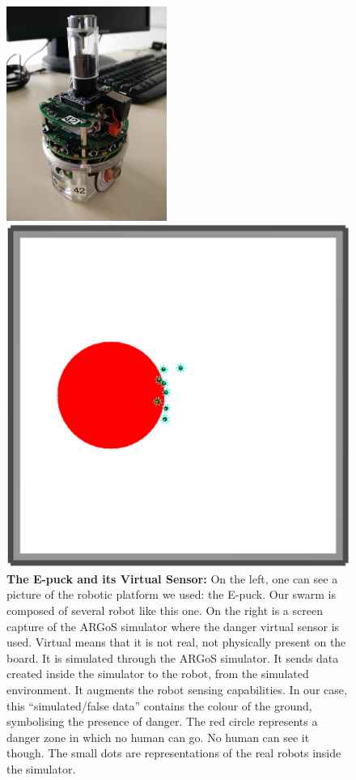 \documentclass[oneside, a4paper, 12pt]{memoir}
\let\oldCaption\caption
\renewcommand{\caption}[2]{
\oldCaption[#1]{{\small\sffamily\bfseries #1:} #2}
}
\begin{document}
		\begin{figure}[!h]
			\begin{minipage}[c]{0.49\textwidth}
				\includegraphics[height=7cm]{images/e-puck.jpg}			
			\end{minipage}
			\begin{minipage}[c]{0.49\textwidth}
				\includegraphics[width=\textwidth]{../Experiments/No_Human/red_circle.png}			
			\end{minipage}
			
			\caption{The E-puck and its Virtual Sensor}{On the left, one can see a picture of the robotic platform we used: the E-puck. Our swarm is composed of several robot like this one. On the right is a screen capture of the ARGoS simulator \citep{pinciroli2012argos} where the danger virtual sensor is used. Virtual means that it is not real, not physically present on the board. It is simulated through the ARGoS simulator. It sends data created inside the simulator to the robot, from the simulated environment. It augments the robot sensing capabilities. In our case, this \enquote{simulated/false data} contains the colour of the ground, symbolising the presence of danger. The red circle represents a danger zone in which no human can go. No human can see it though. The small dots are representations of the real robots inside the simulator.}
			\label{fig:e-puck_red_zones}
		\end{figure}
		
\end{document}
